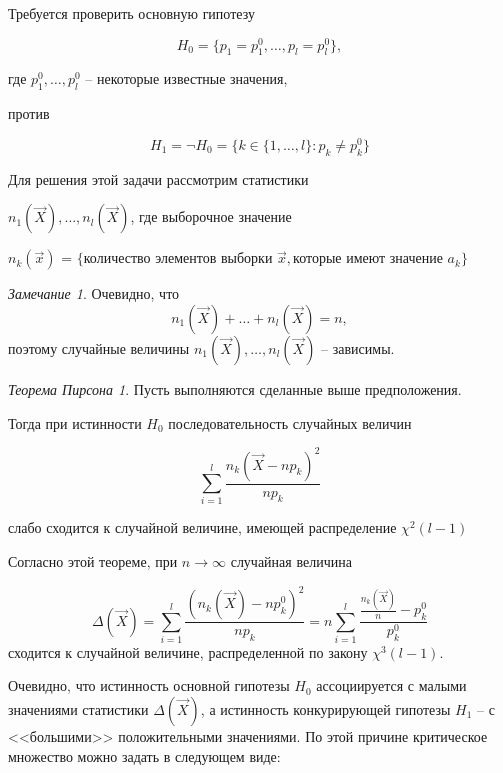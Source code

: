 \documentclass[a4paper, 12pt]{article}
\theoremstyle{definition}
\theoremstyle{leads}
\theoremstyle{example}
\theoremstyle{remark}
\newtheorem{remark}{Замечание}
\begin{document}
Требуется проверить основную гипотезу

\begin{equation*}
	H_0 = \{p_1 = p_1^0, \dots, p_l = p_l^0\}, 
\end{equation*}

где $p_1^0, \dots, p_l^0$ -- некоторые известные значения,

против

\begin{equation*}
	H_1 = \neg H_0 = \{k \in \{1, \dots, l\} : p_k \neq p_k^0\} 
\end{equation*}

Для решения этой задачи рассмотрим статистики

$n_1(\vec{X}), \dots, n_l(\vec{X})$, где выборочное значение 

$n_k(\vec{x})$ = $\{\text{количество элементов выборки  } \vec{x}, \text{которые имеют значение  } a_k \}$

\begin{remark}
	Очевидно, что 
	\begin{equation*}
		n_1(\vec{X}) + \dots + n_l(\vec{X}) = n,
	\end{equation*}
	поэтому случайные величины $n_1(\vec{X}), \dots, n_l(\vec{X})$ -- зависимы.
\end{remark}

\newtheorem*{Piersonn}{Теорема Пирсона}
\begin{Piersonn}
Пусть выполняются сделанные выше предположения.

Тогда при истинности $H_0$ последовательность случайных величин

\begin{center}
	\centering
	$$\sum_{i=1}^{l} \frac{n_k(\vec{X} - np_k)^2}{n p_k}$$
\end{center}

слабо сходится к случайной величине, имеющей распределение $\chi^2(l - 1)$
\end{Piersonn}

Согласно этой теореме, при $n \longrightarrow \infty$ случайная величина

\begin{equation*}
	\Delta(\vec{X}) = \sum_{i=1}^{l} \frac{(n_k(\vec{X}) - n p_k^0)^2}{n p_k} = n \sum_{i=1}^{l} \frac{\frac{n_k(\vec{X})}{n} - p_k^0}{p_k^0}
\end{equation*}
сходится к случайной величине, распределенной по закону $\chi^3(l - 1)$.

Очевидно, что истинность основной гипотезы $H_0$ ассоциируется с малыми значениями статистики $\Delta(\vec{X})$, а истинность конкурирующей гипотезы $H_1$ -- с <<большими>> положительными значениями. По этой причине критическое множество можно задать в следующем виде:
\end{document}

